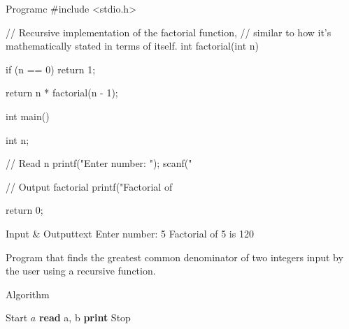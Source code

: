 \documentclass[11pt]{ipu-c}
\begin{document}
    \newpage
    \begin{code}
        {Program}{c}
#include <stdio.h>

// Recursive implementation of the factorial function,
// similar to how it's mathematically stated in terms of itself.
int factorial(int n) {
    if (n == 0) {
        return 1;
    }

    return n * factorial(n - 1);
}

int main() {
    int n;

    // Read n
    printf("Enter number: ");
    scanf("%

    // Output factorial
    printf("Factorial of %

    return 0;
}
    \end{code}
    \begin{code}
        {Input \& Output}{text}
Enter number: 5
Factorial of 5 is 120
    \end{code}


    {Program that finds the greatest common denominator of two integers input by the user using a recursive function.}

    \begin{tabularsection}{Algorithm}
        \begin{algorithmic}[1]
            \State Start
                    \State \Return {}
                \Else
                    \State \Return $a$
                \EndIf
            \EndFunction
            \State \textbf{read} a, b
            \State \textbf{print} 
            \State Stop
        \end{algorithmic}
    \end{tabularsection}
\end{document}
